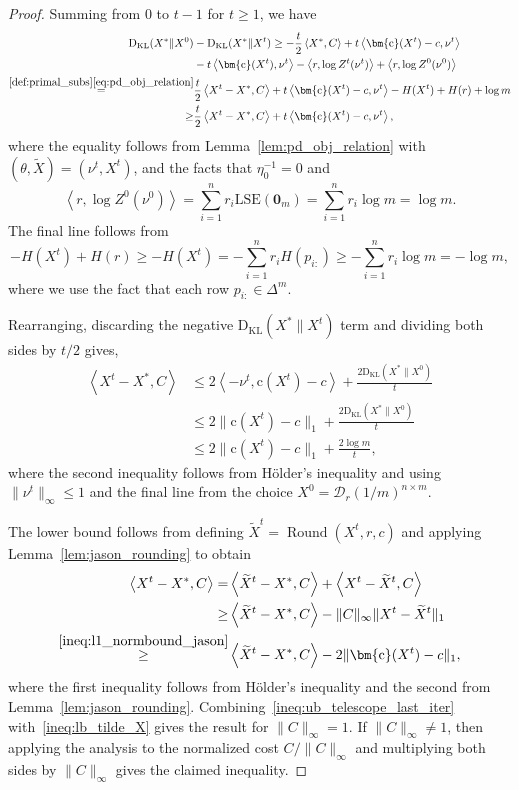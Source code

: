 \documentclass[10pt]{article}
\newcommand{\inner}[2]{\left\langle #1,#2\right\rangle}
\newcommand{\LSE}{\mathrm{LSE}}
\newcommand{\diag}[1]{\mathcal{D}_{#1}}
\theoremstyle{plain}
\theoremstyle{definition}
\theoremstyle{remark}
\newcommand{\KL}{\mathrm{D}_\mathrm{KL}}
\newcommand{\zero}{\mathbf{0}}
\newcommand{\col}{\bm{\mathrm{c}}}
\begin{document}
\begin{proof}
    
    Summing from $0$ to $t-1$ for $t\geq 1$, we have
    \begin{align*}
        \KL(X^*\|X^0)&-\KL(X^*\|X^{t})\geq-\frac{t}{2}\inner{X^*}{C}+t\inner{\col(X^t)-c}{\nu^{t}}\\
        &-t\inner{\col(X^t)}{\nu^{t}}-\inner{r}{\log Z^{t}(\nu^{t})} +\inner{r}{\log Z^{0}(\nu^{0})}\\
        \stackrel{\eqref{def:primal_subs}\eqref{eq:pd_obj_relation}}=&\frac{t}{2}\inner{X^t-X^*}{C}+t\inner{\col(X^t)-c}{\nu^{t}}-H(X^t)+H(r)+\log m\\
        \geq& \frac{t}{2}\inner{X^t-X^*}{C}+t\inner{\col(X^t)-c}{\nu^{t}},
        \end{align*}
    where the equality follows from Lemma~\ref{lem:pd_obj_relation} with $(\theta,\tilde X)=(\nu^t,X^t)$, and the facts that $\eta_0^{-1}=0$ and
    \[
    \inner{r}{\log Z^0(\nu^0)}=\sum_{i=1}^nr_i\LSE(\zero_m) = \sum_{i=1}^nr_i \log m=\log m.
    \]
    The final line follows from
    \[
    -H(X^t)+H(r)\geq-H(X^t)=-\sum_{i=1}^nr_iH(p_{i:})\geq -\sum_{i=1}^nr_i\log m = -\log m,\]
    where we use the fact that each row $p_{i:}\in\Delta^m$.
    
    Rearranging, discarding the negative $\KL(X^*\|X^{t})$ term and dividing both sides by $t/2$ gives,
    \begin{align}
    \nonumber\inner{X^t-X^*}{C}&\leq 2\inner{-\nu^t}{\col(X^t)-c}+\frac{2\KL(X^*\|X^0)}{t}\\
   \nonumber &\leq 2\|\col(X^t)-c\|_1+\frac{2\KL(X^*\|X^0)}{t}\\
    &\leq 2\|\col(X^t)-c\|_1+\frac{2\log m}{t},\label{ineq:ub_telescope_last_iter}
    \end{align}
    where the second inequality follows from Hölder's inequality and using $\|\nu^t\|_\infty\leq 1$ and the final line from the choice $X^0=\diag{r}(1/m)^{n\times m}$. 
    
    The lower bound follows from defining $\widetilde{X}^t=\operatorname{Round}(X^t, r, c)$ and applying Lemma~\ref{lem:jason_rounding} to obtain
    \begin{align}
        \nonumber\inner{X^t-X^*}{C}=&\inner{\widetilde{X}^t-X^*}{C}+\inner{X^t-\widetilde{X}^t}{C}\\
        \nonumber\geq&\inner{\widetilde{X}^t-X^*}{C}-\|C\|_\infty\|X^t-\widetilde{X}^t\|_1\\
        \label{ineq:lb_tilde_X}\stackrel{\eqref{ineq:l1_normbound_jason}}\geq&\inner{\widetilde{X}^t-X^*}{C}-2\|\col(X^t)-c\|_1,
    \end{align}
    where the first inequality follows from Hölder's inequality and the second from Lemma~\ref{lem:jason_rounding}. Combining~\eqref{ineq:ub_telescope_last_iter} with~\eqref{ineq:lb_tilde_X}  gives the result for $\|C\|_\infty=1$. If $\|C\|_\infty\neq 1$, then applying the analysis to the normalized cost $C/\|C\|_\infty$  and multiplying both sides by $\|C\|_\infty$ gives the claimed inequality.
\end{proof}
\end{document}

